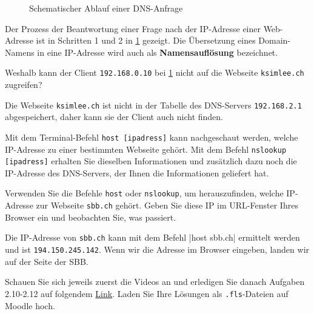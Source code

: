 \begin{figure}[H]
{\begin{tikzpicture}
	\end{tikzpicture}}
	\centering
	\caption{Schematischer Ablauf einer DNS-Anfrage}
	\label{fig:dns}
\end{figure}

Der Prozess der Beantwortung einer Frage nach der IP-Adresse einer Web-Adresse ist in Schritten 1 und 2 in \cref{fig:dns} gezeigt. Die Übersetzung eines Domain-Namens in eine \gls{IP}-Adresse wird auch als \textbf{Namensauflösung} bezeichnet.

\begin{myexercise}
	Weshalb kann der Client \texttt{192.168.0.10} bei \cref{fig:dns} nicht auf die Webseite \texttt{ksimlee.ch} zugreifen?
	\begin{myanswer}
		Die Webseite \texttt{ksimlee.ch} ist nicht in der Tabelle des \gls{DNS}-Servers \texttt{192.168.2.1} abgespeichert, daher kann sie der Client auch nicht finden.
	\end{myanswer}
\end{myexercise}


Mit dem Terminal-Befehl \texttt{host [ipadress]} kann nachgeschaut werden, welche \gls{IP}-Adresse zu einer bestimmten Webseite gehört. Mit dem Befehl \texttt{nslookup [ipadress]} erhalten Sie dieselben Informationen und zusätzlich dazu noch die \gls{IP}-Adresse des \gls{DNS}-Servers, der Ihnen die Informationen geliefert hat.



\begin{myexercise}
	Verwenden Sie die Befehle \texttt{host} oder \texttt{nslookup}, um herauszufinden, welche \gls{IP}-Adresse zur Webseite \texttt{sbb.ch} gehört. Geben Sie diese \gls{IP} im URL-Fenster Ihres Browser ein und beobachten Sie, was passiert.
	\begin{myanswer}
		Die IP-Adresse von \texttt{sbb.ch} kann mit dem Befehl \commandbox|host sbb.ch| ermittelt werden und ist \texttt{194.150.245.142}. Wenn wir die Adresse im Browser eingeben, landen wir auf der Seite der SBB.
	\end{myanswer}
\end{myexercise}

\begin{myexercise}
	Schauen Sie sich jeweils zuerst die Videos an und erledigen Sie danach Aufgaben 2.10-2.12 auf folgendem \href{https://informatik.mygymer.ch/base/?book=network}{Link}. Laden Sie Ihre Lösungen als \texttt{.fls}-Dateien auf Moodle hoch.
\end{myexercise}

